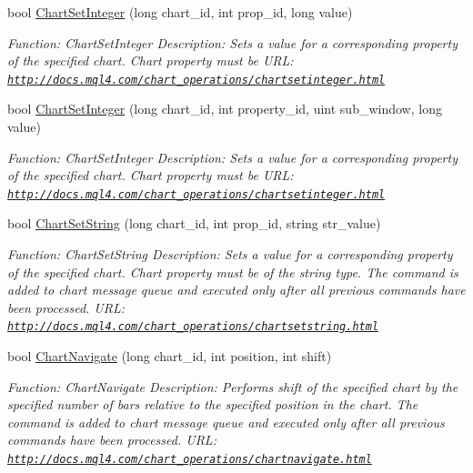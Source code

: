 \begin{DoxyCompactItemize}
bool \hyperlink{class_m_q_l4_c_sharp_1_1_base_1_1_m_q_l_base_aad77595a59a5ec541db34ee320847dca}{Chart\+Set\+Integer} (long chart\+\_\+id, int prop\+\_\+id, long value)
\begin{DoxyCompactList}\small\item\em Function\+: Chart\+Set\+Integer Description\+: Sets a value for a corresponding property of the specified chart. Chart property must be U\+RL\+: \href{http://docs.mql4.com/chart_operations/chartsetinteger.html}{\tt http\+://docs.\+mql4.\+com/chart\+\_\+operations/chartsetinteger.\+html} \end{DoxyCompactList}\item 
bool \hyperlink{class_m_q_l4_c_sharp_1_1_base_1_1_m_q_l_base_afdfa1d4fe0ca0b3d0226feed07d29998}{Chart\+Set\+Integer} (long chart\+\_\+id, int property\+\_\+id, uint sub\+\_\+window, long value)
\begin{DoxyCompactList}\small\item\em Function\+: Chart\+Set\+Integer Description\+: Sets a value for a corresponding property of the specified chart. Chart property must be U\+RL\+: \href{http://docs.mql4.com/chart_operations/chartsetinteger.html}{\tt http\+://docs.\+mql4.\+com/chart\+\_\+operations/chartsetinteger.\+html} \end{DoxyCompactList}\item 
bool \hyperlink{class_m_q_l4_c_sharp_1_1_base_1_1_m_q_l_base_ad95fcd7f13edcb3c671394aa3efc0594}{Chart\+Set\+String} (long chart\+\_\+id, int prop\+\_\+id, string str\+\_\+value)
\begin{DoxyCompactList}\small\item\em Function\+: Chart\+Set\+String Description\+: Sets a value for a corresponding property of the specified chart. Chart property must be of the string type. The command is added to chart message queue and executed only after all previous commands have been processed. U\+RL\+: \href{http://docs.mql4.com/chart_operations/chartsetstring.html}{\tt http\+://docs.\+mql4.\+com/chart\+\_\+operations/chartsetstring.\+html} \end{DoxyCompactList}\item 
bool \hyperlink{class_m_q_l4_c_sharp_1_1_base_1_1_m_q_l_base_ab09d8b94a9d6cf88a3b812ec7df3e26a}{Chart\+Navigate} (long chart\+\_\+id, int position, int shift)
\begin{DoxyCompactList}\small\item\em Function\+: Chart\+Navigate Description\+: Performs shift of the specified chart by the specified number of bars relative to the specified position in the chart. The command is added to chart message queue and executed only after all previous commands have been processed. U\+RL\+: \href{http://docs.mql4.com/chart_operations/chartnavigate.html}{\tt http\+://docs.\+mql4.\+com/chart\+\_\+operations/chartnavigate.\+html} \end{DoxyCompactList}\item 

\end{DoxyCompactItemize}
